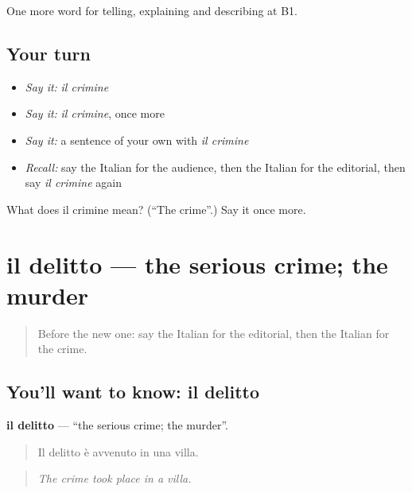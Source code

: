 \begin{grammarlens}[title={What you've built}]
One more word for telling, explaining and describing at B1.
\end{grammarlens}

\subsection*{Your turn}
\begin{itemize}
\raggedright
  \item \emph{Say it:} \emph{il crimine}
  \item \emph{Say it:} \emph{il crimine}, once more
  \item \emph{Say it:} a sentence of your own with \emph{il crimine}
  \item \emph{Recall:} say the Italian for the audience, then the Italian for the editorial, then say \emph{il crimine} again
\end{itemize}

\begin{tcolorbox}[breakable,colback=teal!4,colframe=teal!35!black,title={Before you move on}]
What does il crimine mean? (\textquotedblleft{}The crime\textquotedblright{}.) Say it once more.
\end{tcolorbox}
\section[il delitto]{il delitto — the serious crime; the murder}

\label{lesson:IT-C290-delitto}



\begin{quote}
Before the new one: say the Italian for the editorial, then the Italian for the crime.
\end{quote}

\subsection*{You'll want to know: il delitto}
\textbf{il delitto} — \textquotedblleft{}the serious crime; the murder\textquotedblright{}.

\begin{quote}
Il delitto è avvenuto in una villa.
\end{quote}

\begin{quote}
\emph{The crime took place in a villa.}
\end{quote}

